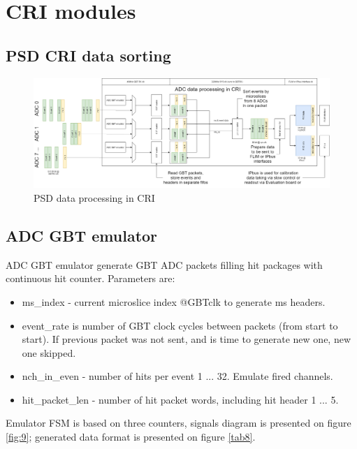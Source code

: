 \documentclass{article}
\begin{document}
\section{CRI modules}

\subsection{PSD CRI data sorting}

\begin{figure}[H]
	\centering 
	\includegraphics[width=1.0\textwidth]{CRI_data_sort.png}
	\caption{\label{fig:11} PSD data processing in CRI}
\end{figure}


\subsection{ADC GBT emulator}

ADC GBT emulator generate GBT ADC packets filling hit packages with continuous hit counter. Parameters are:

\begin{itemize}
\item ms\_index - current microslice index @GBTclk to generate ms headers.


\item  event\_rate is number of GBT clock cycles between packets (from start to start). If previous packet was not sent, and is time to generate new one, new one skipped.

\item nch\_in\_even - number of hits per event 1 ... 32. Emulate fired channels.

\item hit\_packet\_len - number of hit packet words, including hit header 1 ... 5.

\end{itemize}

Emulator FSM is based on three counters, signals diagram is presented on figure \ref{fig:9}; generated data format is presented on figure \ref{tab8}.
\end{document}
